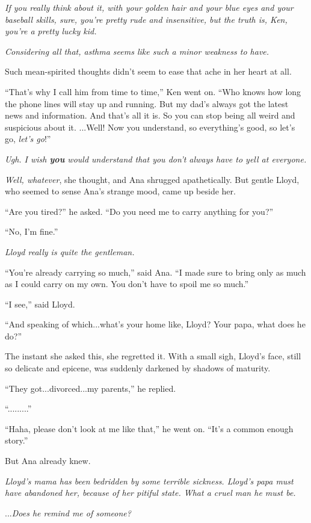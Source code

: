 \documentclass[
]{article}
\begin{document}
\emph{If you really think about it, with your golden hair and your blue
eyes and your baseball skills, sure, you're pretty rude and insensitive,
but the truth is, Ken, you're a pretty lucky kid.}

\emph{Considering all that, asthma seems like such a minor weakness to
have.}

Such mean-spirited thoughts didn't seem to ease that ache in her heart
at all.

``That's why I call him from time to time,'' Ken went on. ``Who knows
how long the phone lines will stay up and running. But my dad's always
got the latest news and information. And that's all it is. So you can
stop being all weird and suspicious about it. ...Well! Now you
understand, so everything's good, so let's go, \emph{let's go}!''

\emph{Ugh. I wish \textbf{you} would understand that you don't always
have to yell at everyone.}

\emph{Well, whatever}, she thought, and Ana shrugged apathetically. But
gentle Lloyd, who seemed to sense Ana's strange mood, came up beside
her.

``Are you tired?'' he asked. ``Do you need me to carry anything for
you?''

``No, I'm fine.''

\emph{Lloyd really is quite the gentleman.}

``You're already carrying so much,'' said Ana. ``I made sure to bring
only as much as I could carry on my own. You don't have to spoil me so
much.''

``I see,'' said Lloyd.

``And speaking of which...what's your home like, Lloyd? Your papa, what
does he do?''

The instant she asked this, she regretted it. With a small sigh, Lloyd's
face, still so delicate and epicene, was suddenly darkened by shadows of
maturity.

``They got...divorced...my parents,'' he replied.

``.........''

``Haha, please don't look at me like that,'' he went on. ``It's a common
enough story.''

But Ana already knew.

\emph{Lloyd's mama has been bedridden by some terrible sickness. Lloyd's
papa must have abandoned her, because of her pitiful state. What a cruel
man he must be.}

...\emph{Does he remind me of someone?}
\end{document}
